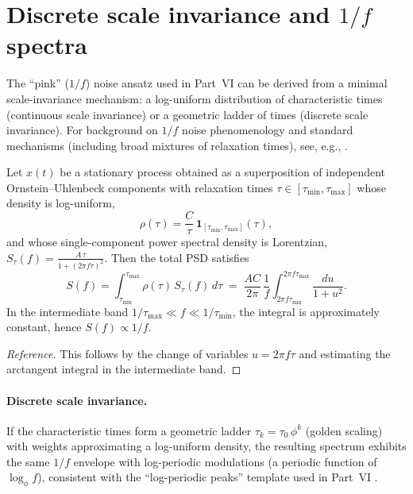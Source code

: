 \section{Discrete scale invariance and \texorpdfstring{$1/f$}{1/f} spectra}
\label{app:one_over_f}
The ``pink'' ($1/f$) noise ansatz used in Part~VI can be derived from a minimal scale-invariance mechanism: a log-uniform distribution of characteristic times (continuous scale invariance) or a geometric ladder of times (discrete scale invariance). For background on $1/f$ noise phenomenology and standard mechanisms (including broad mixtures of relaxation times), see, e.g., \cite{DuttaHorn1981,Weissman1988}.

\begin{proposition}
\label{prop:one_over_f}
Let $x(t)$ be a stationary process obtained as a superposition of independent Ornstein--Uhlenbeck components with relaxation times $\tau\in[\tau_{\min},\tau_{\max}]$ whose density is log-uniform,
\begin{equation}
    \rho(\tau)=\frac{C}{\tau}\,\mathbf{1}_{[\tau_{\min},\tau_{\max}]}(\tau),
\end{equation}
and whose single-component power spectral density is Lorentzian, $S_\tau(f)=\frac{A\,\tau}{1+(2\pi f\tau)^2}$. Then the total PSD satisfies
\begin{equation}
    S(f)=\int_{\tau_{\min}}^{\tau_{\max}} \rho(\tau)\,S_\tau(f)\,d\tau \;=\; \frac{A C}{2\pi}\,\frac{1}{f}\int_{2\pi f\tau_{\min}}^{2\pi f\tau_{\max}} \frac{du}{1+u^2}.
\end{equation}
In the intermediate band $1/\tau_{\max}\ll f\ll 1/\tau_{\min}$, the integral is approximately constant, hence $S(f)\propto 1/f$.
\end{proposition}
\begin{proof}[Reference]
This follows by the change of variables $u=2\pi f\tau$ and estimating the arctangent integral in the intermediate band.
\end{proof}

\paragraph{Discrete scale invariance.}
If the characteristic times form a geometric ladder $\tau_k=\tau_0\,\phi^k$ (golden scaling) with weights approximating a log-uniform density, the resulting spectrum exhibits the same $1/f$ envelope with log-periodic modulations (a periodic function of $\log_\phi f$), consistent with the ``log-periodic peaks'' template used in Part~VI \cite{Sornette1998DSI}.

